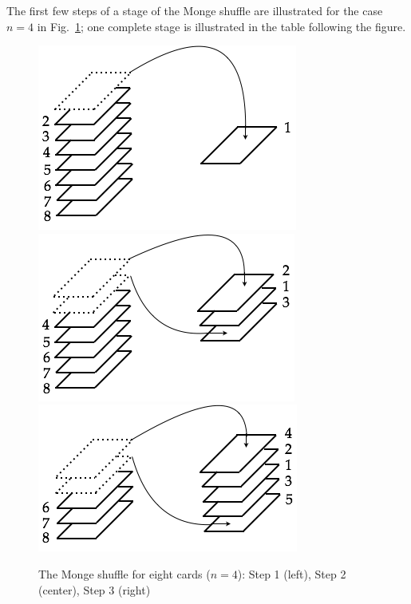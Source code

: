 \begin{enumerate}
\begin{enumerate}
The first few steps of a stage of the Monge shuffle are illustrated for the case $n=4$ in Fig.~\ref{fig:suffleMonge1}; one complete stage is illustrated in the table following the figure.
\begin{figure}[h]
\begin{center}
        \includegraphics[scale=0.33]{FiguresArithmetic/suffleMongeStep1}
        \includegraphics[scale=0.33]{FiguresArithmetic/suffleMongeStep2}
         \includegraphics[scale=0.33]{FiguresArithmetic/suffleMongeStep3}
        \caption{The Monge shuffle for eight cards ($n=4$): Step 1 (left), Step 2 (center), Step 3 (right)}
        \label{fig:suffleMonge1}
\end{center}
\end{figure}
\end{enumerate}
\end{enumerate}
